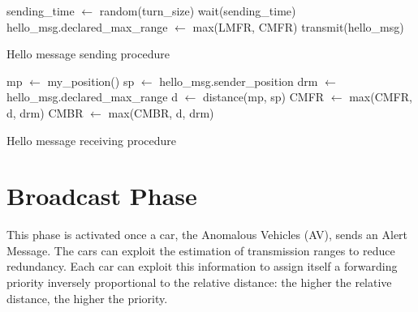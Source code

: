 		\begin{algorithm}[H]
			\begin{algorithmic}[1]
					\State sending\_time $\gets$ random(turn\_size)
					\State wait(sending\_time)
						\State hello\_msg.declared\_max\_range $\gets$ max(LMFR, CMFR)
						\State transmit(hello\_msg)
					\EndIf
				\EndFor
			\end{algorithmic}
			\caption{Hello message sending procedure}
		\end{algorithm}
		
		\begin{algorithm}[H]
			\begin{algorithmic}[1]
				\State mp $\gets$ my\_position()
				\State sp $\gets$ hello\_msg.sender\_position
				\State drm $\gets$ hello\_msg.declared\_max\_range
				\State d $\gets$ distance(mp, sp)
				\State CMFR $\gets$ max(CMFR, d, drm)
				\Else
				\State CMBR $\gets$ max(CMBR, d, drm)
				\EndIf
			\end{algorithmic}
			\caption{Hello message receiving procedure}
		\end{algorithm}
	
	\section{Broadcast Phase}
		This phase is activated once a car, the Anomalous Vehicles (AV), sends an Alert Message. The cars can exploit the estimation of transmission ranges to reduce redundancy. Each car can exploit this information to assign itself a forwarding priority inversely proportional to the relative distance: the higher the relative distance, the higher the priority.  
		
